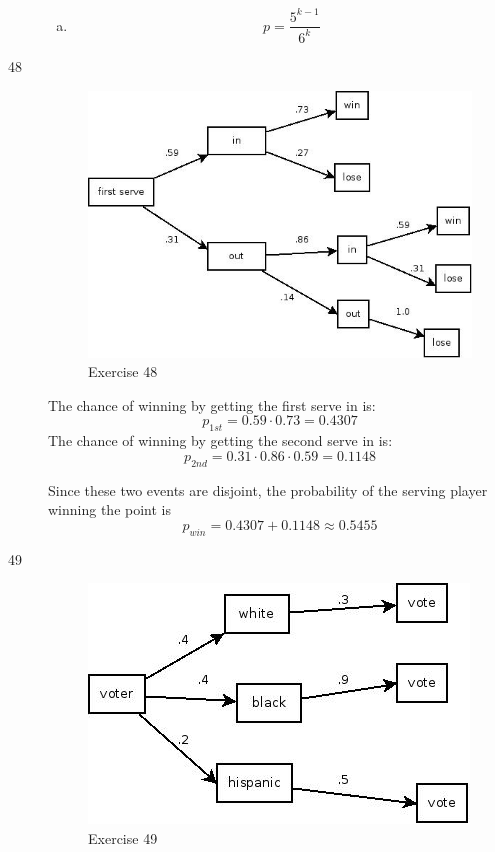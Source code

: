 \documentclass[letterpaper, landscape]{exam}
\begin{document}
\begin{description}
\begin{enumerate}[(a)]
        \item
          \[
            p = \frac{5^{k - 1}}{6^k}
          \]

      \end{enumerate}

    \item[48]
      \begin{figure}[H]
        \centering
        \includegraphics[scale = 0.4]{ex48.jpg}
        \caption{Exercise 48}
      \end{figure}

      The chance of winning by getting the first serve in is:
      \[
        p_{1st} = 0.59 \cdot 0.73 = 0.4307
      \]
      The chance of winning by getting the second serve in is:
      \[
        p_{2nd} = 0.31 \cdot 0.86 \cdot 0.59 = 0.1148
      \]

      Since these two events are disjoint, the probability of the serving player
      winning the point is
      \[
        p_{win} = 0.4307 + 0.1148 \approx \boxed{ 0.5455 }
      \]

    \item[49]
      \begin{figure}[H]
        \centering
        \includegraphics[scale = 0.4]{ex49.jpg}
        \caption{Exercise 49}
      \end{figure}


\end{description}
\end{document}
